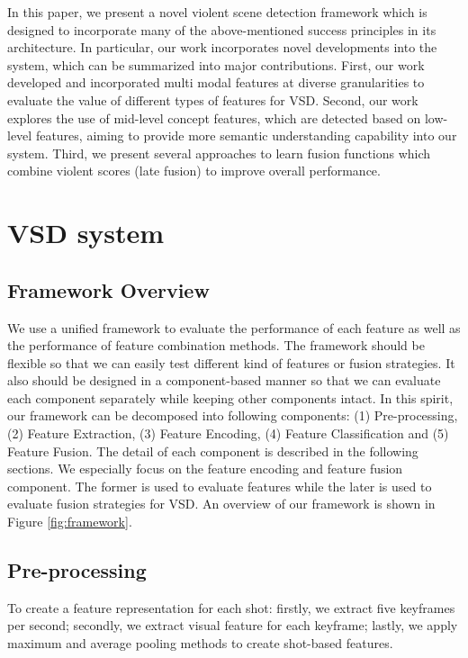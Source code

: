 \documentclass[review]{elsarticle}
\begin{document}
In this paper, we present a novel violent scene detection framework which is designed to incorporate many of the above-mentioned success principles in its architecture. In particular, our work incorporates novel developments into the system, which can be summarized into major contributions. First, our work developed and incorporated multi modal features at diverse granularities to evaluate the value of different types of features for VSD. Second, our work explores the use of mid-level concept features, which are detected based on low-level features, aiming to provide more semantic understanding capability into our system. Third,  we present several approaches to learn fusion functions which combine violent scores (late fusion) to improve overall performance.

\section{VSD system}
\subsection{Framework Overview}
We use a unified framework to evaluate the performance of each feature as well as the performance of feature combination methods. The framework should be flexible so that we can easily test different kind of features or fusion strategies. It also should be designed in a component-based manner so that we can evaluate each component separately while keeping other components intact. In this spirit, our framework can be decomposed into following components: (1) Pre-processing, (2) Feature Extraction, (3) Feature Encoding, (4) Feature Classification and (5) Feature Fusion. The detail of each component is described in the following sections. We especially focus on the feature encoding and feature fusion component. The former is used to evaluate features while the later is used to evaluate fusion strategies for VSD. An overview of our framework is shown in Figure \ref{fig:framework}.

\subsection{Pre-processing}
To create a feature representation for each shot: firstly, we extract five keyframes per second; secondly, we extract visual feature for each keyframe; lastly, we apply maximum and average pooling methods to create shot-based features.
\end{document}
